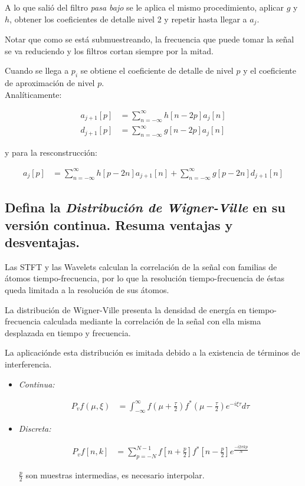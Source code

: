 \documentclass[a4paper,10pt,spanish,oneside]{article}
\begin{document}
A lo que salió del filtro \textit{pasa bajo} se le aplica el mismo procedimiento, aplicar $g$ y $h$, obtener los coeficientes de detalle nivel 2 y repetir hasta llegar a $a_{j}$.

Notar que como se está submuestreando, la frecuencia que puede tomar la señal se va reduciendo y los filtros cortan siempre por la mitad.

Cuando se llega a  $p_{i}$ se obtiene el coeficiente de detalle de nivel $p$ y el coeficiente de aproximación de nivel $p$.\\

Analíticamente:

\begin{align*}
a_{j+1}[p] &= \sum_{n=-\infty}^{\infty}h[n-2p]a_{j}[n] \\
d_{j+1}[p] &= \sum_{n=-\infty}^{\infty}g[n-2p]a_{j}[n]
\end{align*}

y para la resconstrucción:

\begin{align*}
a_{j}[p] &= \sum_{n=-\infty}^{\infty}h[p-2n]a_{j+1}[n]
+\sum_{n=-\infty}^{\infty}g[p-2n]d_{j+1}[n]
\end{align*}

\subsection{Defina la \textit{Distribución de Wigner-Ville} en su versión continua. Resuma ventajas y desventajas.}

Las STFT y las Wavelets calculan la correlación de la señal con familias de átomos tiempo-frecuencia, por lo que la resolución tiempo-frecuencia de éstas queda limitada a la resolución de sus átomos.

La distribución de Wigner-Ville presenta la densidad de energía en tiempo-frecuencia calculada mediante la correlación de la señal con ella misma desplazada en tiempo y frecuencia.

La aplicaciónde esta distribución es imitada debido a la existencia de términos de interferencia.

\begin{itemize}
\item \textit{Continua:}

\begin{align*}
P_{v}f(\mu,\xi) &= \int_{-\infty}^{\infty}f\left(\mu+\frac{\tau}{2}\right)
f^{*}\left(\mu-\frac{\tau}{2}\right)e^{-i\xi\tau}d\tau
\end{align*}

\item \textit{Discreta:}

\begin{align*}
P_{v}f[n,k] &= \sum_{p=-N}^{N-1}f\left[n+\frac{p}{2}\right]
f^{*}\left[n-\frac{p}{2}\right]e^{\frac{-i2\pi kp}{N}}
\end{align*}

$\displaystyle \frac{p}{2}$ son muestras intermedias, es necesario interpolar.\\

\end{itemize}
\end{document}
